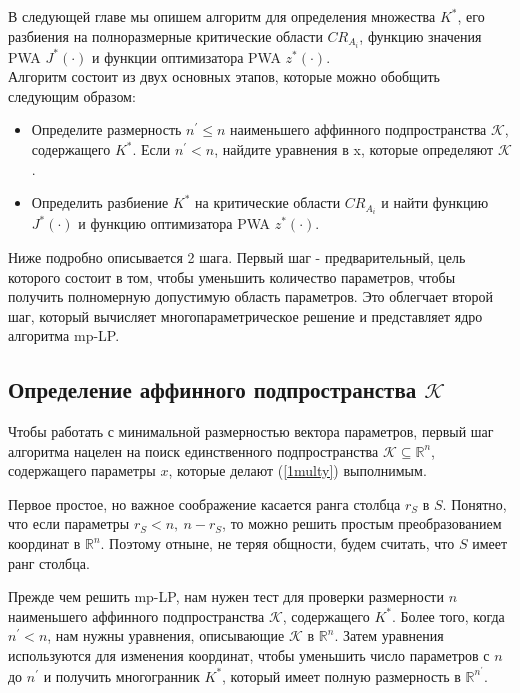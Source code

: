 В следующей главе мы опишем алгоритм для определения множества $K^*$, его разбиения на полноразмерные критические области $CR_{A_i}$, функцию значения PWA $J^*(\cdot)$ и функции оптимизатора PWA $z^* (\cdot)$.\\

Алгоритм состоит из двух основных этапов, которые можно обобщить следующим образом:
\begin{itemize}
    \item Определите размерность $n^{'} \leq n$ наименьшего аффинного подпространства $\mathcal{K}$, содержащего $K^*$. Если $n^{'} < n$, найдите уравнения в x, которые определяют $\mathcal{K}$.
    \item Определить разбиение $K^*$ на критические области $CR_{A_i}$ и найти функцию $J^* (\cdot)$ и функцию оптимизатора PWA $z^* (\cdot)$.
\end{itemize}

Ниже подробно описывается 2 шага. Первый шаг - предварительный, цель которого состоит в том, чтобы уменьшить количество параметров, чтобы получить полномерную допустимую область параметров. Это облегчает второй шаг, который вычисляет многопараметрическое решение и представляет ядро алгоритма mp-LP.\\

\subsection{Определение аффинного подпространства $\mathcal{K}$}

Чтобы работать с минимальной размерностью вектора параметров, первый шаг алгоритма нацелен на поиск единственного подпространства $\mathcal{K} \subseteq \mathbb{R}^{n}$, содержащего параметры $x$, которые делают (\ref{1multy}) выполнимым.

Первое простое, но важное соображение касается ранга столбца $r_{S}$ в $S$. Понятно, что если параметры $r_{S} < n,\  n - r_{S}$, то можно решить простым преобразованием координат в $\mathbb{R}^{n}$. Поэтому отныне, не теряя общности, будем считать, что $S$ имеет ранг столбца.

Прежде чем решить mp-LP, нам нужен тест для проверки размерности $n$ наименьшего аффинного подпространства $\mathcal{K}$, содержащего $K^*$. Более того, когда $n^{'} < n$, нам нужны уравнения, описывающие $\mathcal{K}$ в $\mathbb{R}^n$. Затем уравнения используются для изменения координат, чтобы уменьшить число параметров с $n$ до $n^{'}$ и получить многогранник $K^*$, который имеет полную размерность в $\mathbb{R}^{n^{'}}$.

